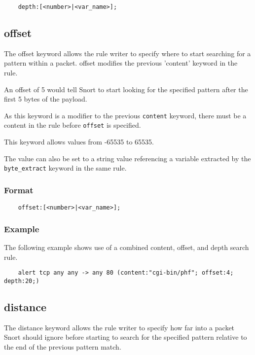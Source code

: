 \documentclass[english]{report}
\begin{document}
\begin{verbatim}
    depth:[<number>|<var_name>];
\end{verbatim}

\subsection{offset}
\label{sub:offset}

The offset keyword allows the rule writer to specify where to start searching
for a pattern within a packet.  offset modifies the previous 'content' keyword
in the rule.

An offset of 5 would tell Snort to start looking for the specified pattern
after the first 5 bytes of the payload.

As this keyword is a modifier to the previous \texttt{content} keyword, there must be
a content in the rule before \texttt{offset} is specified.

This keyword allows values from -65535 to 65535.

The value can also be set to a string value referencing a variable extracted by the
\texttt{byte\_extract} keyword in the same rule.

\subsubsection{Format}

\begin{verbatim}
    offset:[<number>|<var_name>];
\end{verbatim}

\subsubsection{Example}

The following example shows use of a combined content, offset, and depth search
rule.

\begin{verbatim}
    alert tcp any any -> any 80 (content:"cgi-bin/phf"; offset:4; depth:20;)
\end{verbatim}

\subsection{distance}
\label{sub:Distance}

The distance keyword allows the rule writer to specify how far into a packet
Snort should ignore before starting to search for the specified pattern
relative to the end of the previous pattern match.  
\end{document}
